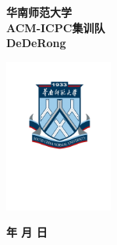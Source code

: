 \documentclass[9pt]{article}
\begin{document}
\thispagestyle{empty}
\null\vfill
\begin{center}
\Huge \textbf{华南师范大学 \\ACM-ICPC集训队 \\DeDeRong}

\vspace{1.5cm}

\includegraphics[height=5cm]{logo.pdf}

\date{\today}{\textbf{\number\year 年 \number\month 月 \number\day 日}}
\end{center}
\vfill
\clearpage

\begin{onecolumn}
\tableofcontents
\end{onecolumn}

\newpage
\columnseprule=0.05pt
\begin{onecolumn}

\end{onecolumn}
\end{document}
